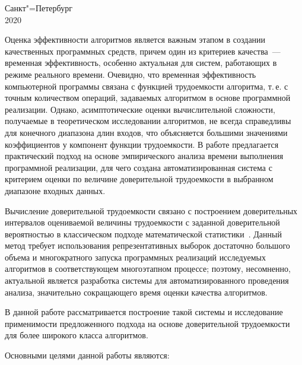 \documentclass[a4paper, article, 14pt]{extarticle}
\begin{document}
\begin{center}
	Санкт"=Петербург\\
	2020
\end{center}
\thispagestyle{empty} %


\newpage

\tableofcontents

\newpage

\label{sec:introduction}

Оценка эффективности алгоритмов является важным этапом в создании качественных программных средств, причем один из критериев качества~--- временная эффективность, особенно актуальная для систем, работающих в режиме реального времени. Очевидно, что временная эффективность компьютерной программы связана с функцией трудоемкости алгоритма, т.\,е. с точным количеством операций, задаваемых алгоритмом в основе программной реализации. Однако, асимптотические оценки вычислительной сложности, получаемые в теоретическом исследовании алгоритмов, не всегда справедливы для конечного диапазона длин входов, что объясняется большими значениями коэффициентов у компонент функции трудоемкости. В работе предлагается практический подход на основе эмпирического анализа времени выполнения программной реализации, для чего создана автоматизированная система с критерием оценки по величине доверительной трудоемкости в выбранном диапазоне входных данных.

Вычисление доверительной трудоемкости связано с построением доверительных интервалов оцениваемой величины трудоемкости с заданной доверительной вероятностью в классическом подходе математической статистики~\cite{petrushyn_ulyanov_analysis}. Данный метод требует использования репрезентативных выборок достаточно большого объема и многократного запуска программных реализаций исследуемых алгоритмов в соответствующем многоэтапном процессе; поэтому, несомненно, актуальной является разработка системы для автоматизированного проведения анализа, значительно сокращающего время оценки качества алгоритмов.

В данной работе рассматривается построение такой системы и исследование применимости предложенного подхода на основе доверительной трудоемкости для более широкого класса алгоритмов.

\label{sec:problem_statement}

Основными целями данной работы являются:
\end{document}
